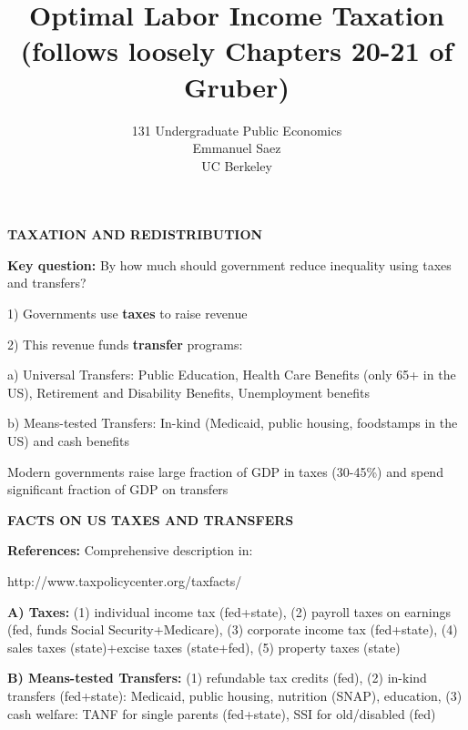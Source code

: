 \documentclass[landscape]{slides}
\author{131 Undergraduate Public Economics \\ Emmanuel Saez \\ UC Berkeley}
\date{}
\title{Optimal Labor Income Taxation \\ (follows loosely Chapters 20-21 of Gruber)}
\begin{document}
\begin{slide}
\maketitle
\end{slide}

\begin{slide}
\begin{center}
{\bf TAXATION AND REDISTRIBUTION}
\end{center}

{\bf Key question:} By how much should government reduce inequality using
taxes and transfers?

1) Governments use {\bf taxes} to raise revenue

2) This revenue funds {\bf transfer} programs:

a) Universal Transfers: Public Education, Health Care Benefits
(only 65+ in the US), Retirement and Disability Benefits,
Unemployment benefits

b) Means-tested Transfers: In-kind (Medicaid, public housing, foodstamps in the US) and cash benefits

Modern governments raise large fraction of GDP in taxes (30-45\%)
and spend significant fraction of GDP on transfers

\end{slide}

\begin{slide}
\begin{center}
{\bf FACTS ON US TAXES AND TRANSFERS}
\end{center}
{\bf References:} Comprehensive description in:

http://www.taxpolicycenter.org/taxfacts/

{\bf A) Taxes:} (1) individual income tax (fed+state), (2) payroll
taxes on earnings (fed, funds Social Security+Medicare), (3)
corporate income tax (fed+state), (4) sales taxes (state)+excise
taxes (state+fed), (5) property taxes (state)

{\bf B) Means-tested Transfers:} (1) refundable tax credits (fed),
(2) in-kind transfers (fed+state): Medicaid, public housing, nutrition
(SNAP), education, (3) cash welfare: TANF for single parents
(fed+state), SSI for old/disabled (fed)

\end{slide}
\end{document}
